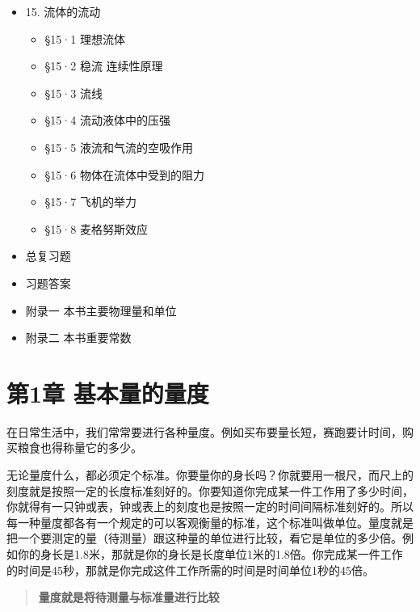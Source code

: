 \begin{itemize}
  \begin{itemize}
  \tightlist
  \item
    §14·1 行星的运动
  \item
    §14·2 万有引力定律
  \item
    §14·3 重力加速度随高度的变化
  \item
    §14·4 人造卫星
  \end{itemize}
\item
  15. 流体的流动

  \begin{itemize}
  \tightlist
  \item
    §15·1 理想流体
  \item
    §15·2 稳流 连续性原理
  \item
    §15·3 流线
  \item
    §15·4 流动液体中的压强
  \item
    §15·5 液流和气流的空吸作用
  \item
    §15·6 物体在流体中受到的阻力
  \item
    §15·7 飞机的举力
  \item
    §15·8 麦格努斯效应
  \end{itemize}
\item
  总复习题
\item
  习题答案
\item
  附录一 本书主要物理量和单位
\item
  附录二 本书重要常数
\end{itemize}

\chapter{第1章
基本量的量度}\label{ux7b2c1ux7ae0-ux57faux672cux91cfux7684ux91cfux5ea6}

在日常生活中，我们常常要进行各种量度。例如买布要量长短，赛跑要计时间，购买粮食也得称量它的多少。

无论量度什么，都必须定个标准。你要量你的身长吗？你就要用一根尺，而尺上的刻度就是按照一定的长度标准刻好的。你要知道你完成某一件工作用了多少时间，你就得有一只钟或表，钟或表上的刻度也是按照一定的时间间隔标准刻好的。所以每一种量度都各有一个规定的可以客观衡量的标准，这个标准叫做单位。量度就是把一个要测定的量（待测量）跟这种量的单位进行比较，看它是单位的多少倍。例如你的身长是1.8米，那就是你的身长是长度单位1米的1.8倍。你完成某一件工作的时间是45秒，那就是你完成这件工作所需的时间是时间单位1秒的45倍。

\begin{quote}
\textbf{量度就是将待测量与标准量进行比较}
\end{quote}

